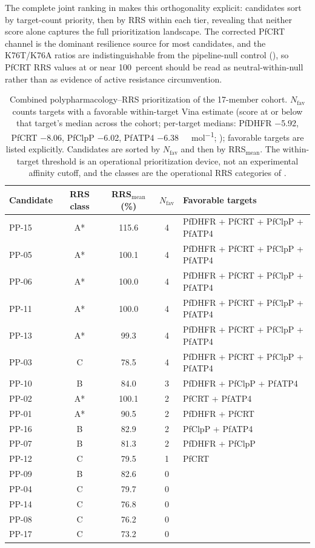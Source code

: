 \documentclass[journal=jcisd8,manuscript=article]{achemso}
\begin{document}
The complete joint ranking in  makes this orthogonality explicit: candidates sort by target-count priority, then by RRS within each tier, revealing that neither score alone captures the full prioritization landscape. The corrected PfCRT channel is the dominant resilience source for most candidates, and the K76T/K76A ratios are indistinguishable from the pipeline-null control (), so PfCRT RRS values at or near \num{100}~percent should be read as neutral-within-null rather than as evidence of active resistance circumvention.

\begin{table}[ht!]
\centering
\caption{Combined polypharmacology--RRS prioritization of the 17-member cohort. $N_{\mathrm{fav}}$ counts targets with a favorable within-target Vina estimate (score at or below that target's median across the cohort; per-target medians: PfDHFR \num{-5.92}, PfCRT \num{-8.06}, PfClpP \num{-6.02}, PfATP4 \num{-6.38}~\si{\kilo\calorie\per\mole}; ); favorable targets are listed explicitly. Candidates are sorted by $N_{\mathrm{fav}}$ and then by RRS$_{\mathrm{mean}}$. The within-target threshold is an operational prioritization device, not an experimental affinity cutoff, and the classes are the operational RRS categories of .}
\label{tab:dual_priority}
\small
\begin{tabular}{@{}lcccl@{}}
\toprule
Candidate & RRS class & RRS$_{\mathrm{mean}}$ (\%) & $N_{\mathrm{fav}}$ & Favorable targets \\
\midrule
PP-15 & A* & \num{115.6} & 4 & PfDHFR + PfCRT + PfClpP + PfATP4 \\
PP-05 & A* & \num{100.1} & 4 & PfDHFR + PfCRT + PfClpP + PfATP4 \\
PP-06 & A* & \num{100.0} & 4 & PfDHFR + PfCRT + PfClpP + PfATP4 \\
PP-11 & A* & \num{100.0} & 4 & PfDHFR + PfCRT + PfClpP + PfATP4 \\
PP-13 & A* & \num{99.3} & 4 & PfDHFR + PfCRT + PfClpP + PfATP4 \\
PP-03 & C & \num{78.5} & 4 & PfDHFR + PfCRT + PfClpP + PfATP4 \\
PP-10 & B & \num{84.0} & 3 & PfDHFR + PfClpP + PfATP4 \\
PP-02 & A* & \num{100.1} & 2 & PfCRT + PfATP4 \\
PP-01 & A* & \num{90.5} & 2 & PfDHFR + PfCRT \\
PP-16 & B & \num{82.9} & 2 & PfClpP + PfATP4 \\
PP-07 & B & \num{81.3} & 2 & PfDHFR + PfClpP \\
PP-12 & C & \num{79.5} & 1 & PfCRT \\
PP-09 & B & \num{82.6} & 0 & \textemdash{} \\
PP-04 & C & \num{79.7} & 0 & \textemdash{} \\
PP-14 & C & \num{76.8} & 0 & \textemdash{} \\
PP-08 & C & \num{76.2} & 0 & \textemdash{} \\
PP-17 & C & \num{73.2} & 0 & \textemdash{} \\
\bottomrule
\end{tabular}
\end{table}
\end{document}

